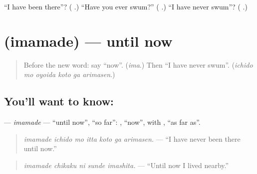 \begin{tcolorbox}[breakable,colback=teal!4,colframe=teal!35!black,title={Before you move on}]
\textquotedblleft{}I have been there\textquotedblright{}? (\textbf{  }.) \textquotedblleft{}Have you ever swum?\textquotedblright{} (\textbf{  }.) \textquotedblleft{}I have never swum\textquotedblright{}? (\textbf{   }.)
\end{tcolorbox}
\section[\texorpdfstring{\ja{今}\ja{まで} (imamade)}{今まで (imamade)}]{ (imamade) — until now}

\label{lesson:JA-C258-imamade}



\begin{quote}
Before the new word: say \textquotedblleft{}now\textquotedblright{}. (\emph{ima}.) Then \textquotedblleft{}I have never swum\textquotedblright{}. (\emph{ichido mo oyoida koto ga arimasen}.)
\end{quote}

\subsection*{You'll want to know: }
\textbf{} — \emph{imamade} — \textquotedblleft{}until now\textquotedblright{}, \textquotedblleft{}so far\textquotedblright{}: \textbf{}, \textquotedblleft{}now\textquotedblright{}, with \textbf{}, \textquotedblleft{}as far as\textquotedblright{}.

\begin{quote}
\textbf{    }
\end{quote}

\begin{quote}
\emph{imamade ichido mo itta koto ga arimasen.} — \textquotedblleft{}I have never been there until now.\textquotedblright{}
\end{quote}

\begin{quote}
\textbf{  }
\end{quote}

\begin{quote}
\emph{imamade chikaku ni sunde imashita.} — \textquotedblleft{}Until now I lived nearby.\textquotedblright{}
\end{quote}

